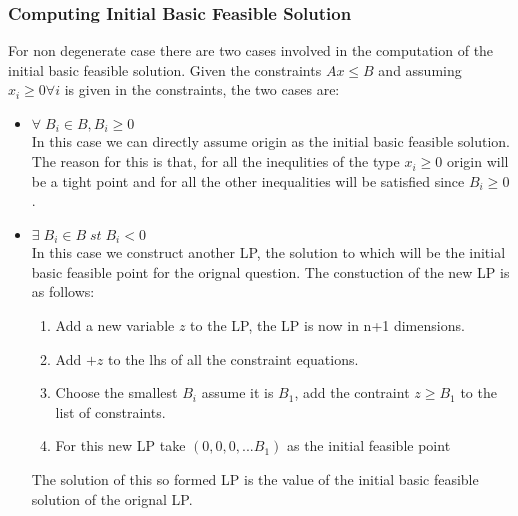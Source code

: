 \documentclass[a4paper,12pt]{report}
\begin{document}
\subsubsection{Computing Initial Basic Feasible Solution}
For non degenerate case there are two cases involved in the computation of the initial basic feasible solution. Given the constraints $Ax \leq B$ and assuming $ x_i \geq 0 \forall i$ is given in the constraints, the two cases are:
\begin{itemize}
\item $\forall \;B_i \in B, B_i \geq 0$\\
In this case we can directly assume origin as the initial basic feasible solution. The reason for this is that, for all the inequlities of the type $x_i \geq 0$ origin will be a tight point and for all the other inequalities will be satisfied since $B_i \geq 0$.
\item $\exists \;B_i \in B\; st \;B_i < 0$\\
In this case we construct another LP, the solution to which will be the initial basic feasible point for the orignal question. The constuction of the new LP is as follows:
\begin{enumerate}
\item Add a new variable $z$ to the LP, the LP is now in n+1 dimensions.
\item Add $+z$ to the lhs of all the constraint equations.
\item Choose the smallest $B_i$ assume it is $B_1$, add the contraint $z \geq B_1$ to the list of constraints.
\item For this new LP take $(0,0,0,...B_1)$ as the initial feasible point
\end{enumerate}
The solution of this so formed LP is the value of the initial basic feasible solution of the orignal LP.
\end{itemize}
\end{document}
